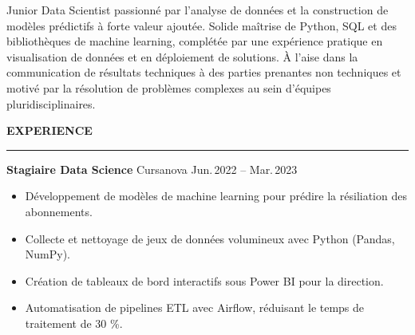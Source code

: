 \documentclass[11pt,a4paper]{article}
\newcommand{\sectiontitle}[1]{%
  \vspace{1em}\textbf{\uppercase{#1}}\par\vspace{.2em}
  \hrule height 0.7pt\relax\vspace{.8em}}
\newcommand{\job}[4]{%
  \textbf{#1} \hfill \faBuilding\;#2 \hfill \faCalendar\;#3\par
  \begin{itemize}\setlength\itemsep{.2em}#4\end{itemize}\vspace{.6em}}
\begin{document}
\vspace{1.2em}
\fboxsep=8pt
\colorbox{gray!8}{%
  \parbox{\dimexpr\linewidth-2\fboxsep}{%
  \small Junior Data Scientist passionné par l’analyse de données et la construction de modèles prédictifs à forte valeur ajoutée. Solide maîtrise de Python, SQL et des bibliothèques de machine learning, complétée par une expérience pratique en visualisation de données et en déploiement de solutions. À l’aise dans la communication de résultats techniques à des parties prenantes non techniques et motivé par la résolution de problèmes complexes au sein d’équipes pluridisciplinaires.}}

\sectiontitle{Experience}

\job
  {Stagiaire Data Science}
  {Cursanova}
  {Jun.\,2022 – Mar.\,2023}
  {
    \item Développement de modèles de machine learning pour prédire la résiliation des abonnements.
    \item Collecte et nettoyage de jeux de données volumineux avec Python (Pandas, NumPy).
    \item Création de tableaux de bord interactifs sous Power BI pour la direction.
    \item Automatisation de pipelines ETL avec Airflow, réduisant le temps de traitement de 30 \%.
  }
\end{document}
